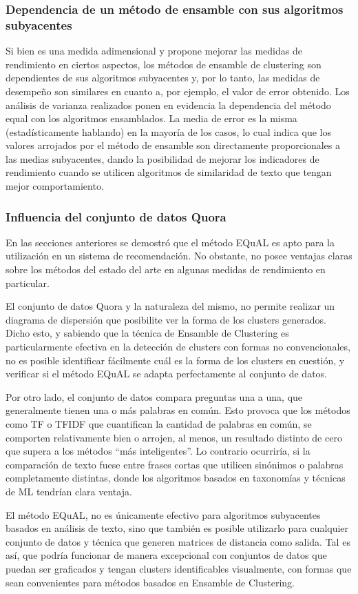 \subsubsection{Dependencia de un método de ensamble con sus algoritmos subyacentes}
Si bien es una medida adimensional y propone mejorar las medidas de rendimiento en ciertos aspectos, los métodos de ensamble de clustering son dependientes de sus algoritmos subyacentes y, por lo tanto, las medidas de desempeño son similares en cuanto a, por ejemplo, el valor de error obtenido. Los análisis de varianza realizados ponen en evidencia la dependencia del método equal con los algoritmos ensamblados. La media de error es la misma (estadísticamente hablando) en la mayoría de los casos, lo cual indica que los valores arrojados por el método de ensamble son directamente proporcionales a las medias subyacentes, dando la posibilidad de mejorar los indicadores de rendimiento cuando se utilicen algoritmos de similaridad de texto que tengan mejor comportamiento.

\subsubsection{Influencia del conjunto de datos Quora}
En las secciones anteriores se demostró que el método EQuAL es apto para la utilización en un sistema de recomendación. No obstante, no posee ventajas claras sobre los métodos del estado del arte en algunas medidas de rendimiento en particular.

\bigskip El conjunto de datos Quora y la naturaleza del mismo, no permite realizar un diagrama de dispersión que posibilite ver la forma de los clusters generados. Dicho esto, y sabiendo que la técnica de Ensamble de Clustering es particularmente efectiva en la detección de clusters con formas no convencionales, no es posible identificar fácilmente cuál es la forma de los clusters en cuestión, y verificar si el método EQuAL se adapta perfectamente al conjunto de datos.

\bigskip Por otro lado, el conjunto de datos compara preguntas una a una, que generalmente tienen una o más palabras en común. Esto provoca que los métodos como TF o TFIDF que cuantifican la cantidad de palabras en común, se comporten relativamente bien o arrojen, al menos, un  resultado distinto de cero que supera a los métodos “más inteligentes”. Lo contrario ocurriría, si la comparación de texto fuese entre frases cortas que utilicen sinónimos o palabras completamente distintas, donde los algoritmos basados en taxonomías y técnicas de ML tendrían clara ventaja.

\bigskip El método EQuAL, no es únicamente efectivo para algoritmos subyacentes basados en análisis de texto, sino que también es posible utilizarlo para cualquier conjunto de datos y técnica que generen matrices de distancia como salida. Tal es así, que podría funcionar de manera excepcional con conjuntos de datos que puedan ser graficados y tengan clusters identificables visualmente, con formas que sean convenientes para métodos basados en Ensamble de Clustering.
